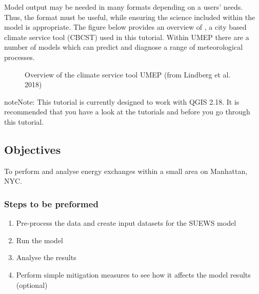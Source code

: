 \documentclass[letterpaper,10pt,english]{sphinxmanual}
\begin{document}
Model output may be needed in many formats depending on a users’ needs.
Thus, the format must be useful, while ensuring the science included
within the model is appropriate. The figure below provides an overview of
{\hyperref[\detokenize{index:index-page}]{}}, a city based climate service tool (CBCST) used in this tutorial. Within UMEP there are a number
of models which can predict and diagnose a range of meteorological processes.

\begin{figure}[htbp]
\centering
\capstart

\noindent{}
\caption{Overview of the climate service tool UMEP (from Lindberg et al. 2018)}\label{\detokenize{Tutorials/SuewsSpatial:id5}}\end{figure}

\begin{sphinxadmonition}{note}{Note:}
This tutorial is currently designed to work with QGIS 2.18. It is recommended that you have a look at the tutorials {\hyperref[\detokenize{Tutorials/IntroductionToSuews:introductiontosuews}]{}} and {\hyperref[\detokenize{processor/Urban Energy Balance Urban Energy Balance (SUEWS.BLUEWS, advanced):suewsadvanced}]{}} before you go through this tutorial.
\end{sphinxadmonition}


\subsection{Objectives}
\label{\detokenize{Tutorials/SuewsSpatial:objectives}}
To perform and analyse energy exchanges within a small area on Manhattan, NYC.


\subsubsection{Steps to be preformed}
\label{\detokenize{Tutorials/SuewsSpatial:steps-to-be-preformed}}\begin{enumerate}
\item {} 
Pre-process the data and create input datasets for the SUEWS model

\item {} 
Run the model

\item {} 
Analyse the results

\item {} 
Perform simple mitigation measures to see how it affects the model results (optional)

\end{enumerate}
\end{document}
